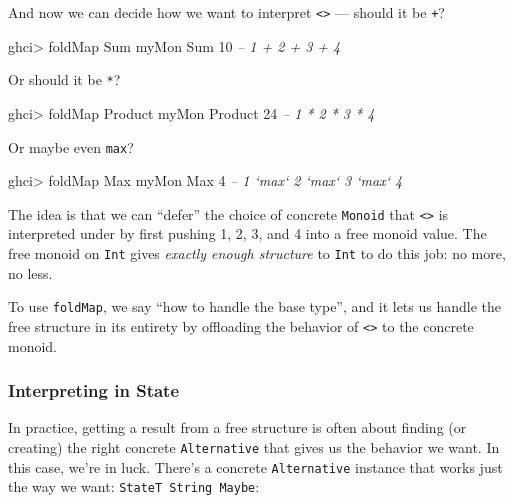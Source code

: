 \documentclass[]{article}
\newenvironment{Shaded}{}{}
\newcommand{\CommentTok}[1]{\textcolor[rgb]{0.38,0.63,0.69}{\textit{#1}}}
\newcommand{\DataTypeTok}[1]{\textcolor[rgb]{0.56,0.13,0.00}{#1}}
\newcommand{\DecValTok}[1]{\textcolor[rgb]{0.25,0.63,0.44}{#1}}
\newcommand{\FunctionTok}[1]{\textcolor[rgb]{0.02,0.16,0.49}{#1}}
\newcommand{\NormalTok}[1]{#1}
\begin{document}
And now we can decide how we want to interpret
\texttt{\textless{}\textgreater{}} --- should it be \texttt{+}?

\begin{Shaded}
\begin{Highlighting}[]
\NormalTok{ghci}\FunctionTok{>} \FunctionTok{foldMap} \DataTypeTok{Sum}\NormalTok{ myMon}
\DataTypeTok{Sum} \DecValTok{10}              \CommentTok{-- 1 + 2 + 3 + 4}
\end{Highlighting}
\end{Shaded}

Or should it be \texttt{*}?

\begin{Shaded}
\begin{Highlighting}[]
\NormalTok{ghci}\FunctionTok{>} \FunctionTok{foldMap} \DataTypeTok{Product}\NormalTok{ myMon}
\DataTypeTok{Product} \DecValTok{24}          \CommentTok{-- 1 * 2 * 3 * 4}
\end{Highlighting}
\end{Shaded}

Or maybe even \texttt{max}?

\begin{Shaded}
\begin{Highlighting}[]
\NormalTok{ghci}\FunctionTok{>} \FunctionTok{foldMap} \DataTypeTok{Max}\NormalTok{ myMon}
\DataTypeTok{Max} \DecValTok{4}          \CommentTok{-- 1 `max` 2 `max` 3 `max` 4}
\end{Highlighting}
\end{Shaded}

The idea is that we can ``defer'' the choice of concrete \texttt{Monoid} that
\texttt{\textless{}\textgreater{}} is interpreted under by first pushing 1, 2,
3, and 4 into a free monoid value. The free monoid on \texttt{Int} gives
\emph{exactly enough structure} to \texttt{Int} to do this job: no more, no
less.

To use \texttt{foldMap}, we say ``how to handle the base type'', and it lets us
handle the free structure in its entirety by offloading the behavior of
\texttt{\textless{}\textgreater{}} to the concrete monoid.

\hypertarget{interpreting-in-state}{%
\subsubsection{Interpreting in State}\label{interpreting-in-state}}

In practice, getting a result from a free structure is often about finding (or
creating) the right concrete \texttt{Alternative} that gives us the behavior we
want. In this case, we're in luck. There's a concrete \texttt{Alternative}
instance that works just the way we want: \texttt{StateT\ String\ Maybe}:
\end{document}
